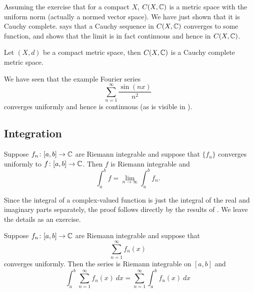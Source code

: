 Assuming the exercise that for a compact $X$, $C(X,{\mathbb{C}})$ is a metric space with
the uniform norm (actually a normed vector space).  We have just shown that
it is Cauchy complete.   says that a Cauchy
sequence in $C(X,{\mathbb{C}})$ converges to some function,
and  shows that the limit is in fact
continuous and hence in $C(X,{\mathbb{C}})$.

\begin{cor}
Let $(X,d)$ be a compact metric space, then $C(X,{\mathbb{C}})$ is a Cauchy
complete metric space.
\end{cor}

\begin{example}
We have seen that the example Fourier series 
\begin{equation*}
\sum_{n=1}^\infty \frac{\sin(nx)}{n^2}
\end{equation*}
converges uniformly and hence is continuous (as is visible
in ).
\end{example}

\subsection{Integration}

\begin{prop} \label{prop:complexlimitswapintegral}
Suppose $f_n \colon [a,b] \to {\mathbb{C}}$
are Riemann integrable and suppose that $\{ f_n \}$ converges
uniformly to $f \colon [a,b] \to {\mathbb{C}}$.  Then $f$ is Riemann integrable
and
\begin{equation*}
\int_a^b f = \lim_{n\to \infty} \int_a^b f_n .
\end{equation*}
\end{prop}

Since the integral of a complex-valued function is just the integral of
the real and imaginary parts separately,
the proof follows directly by the results of .  We
leave the details as an exercise.

\begin{cor}
Suppose $f_n \colon [a,b] \to {\mathbb{C}}$
are Riemann integrable and suppose that
\begin{equation*}
\sum_{n=1}^\infty f_n(x)
\end{equation*}
converges uniformly.  Then the series is Riemann integrable on $[a,b]$
and
\begin{equation*}
\int_a^b \sum_{n=1}^\infty f_n(x) ~dx
=
\sum_{n=1}^\infty \int_a^b f_n(x) ~dx
\end{equation*}
\end{cor}

